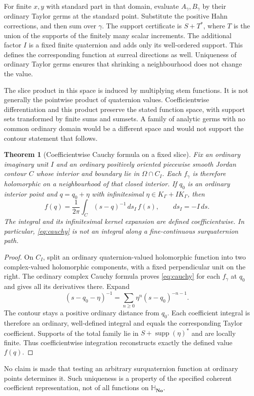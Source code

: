 \documentclass[11pt,letterpaper]{article}
\newtheorem{theorem}{Theorem}[section]
\theoremstyle{definition}
\newcommand{\No}{\mathbf{No}}
\newcommand{\SQ}{\mathbb H_{\No}}
\DeclareMathOperator{\supp}{supp}
\begin{document}
For finite $x,y$ with standard part in that domain, evaluate $A_\gamma,B_\gamma$
by their ordinary Taylor germs at the standard point. Substitute the positive
Hahn corrections, and then sum over $\gamma$. The support certificate is
$S+T^*$, where $T$ is the union of the supports of the finitely many scalar
increments. The additional factor $I$ is a fixed finite quaternion and adds
only its well-ordered support. This defines the corresponding function at
surreal directions as well. Uniqueness of ordinary Taylor germs ensures that
shrinking a neighbourhood does not change the value.

The slice product in this space is induced by multiplying stem functions. It
is not generally the pointwise product of quaternion values. Coefficientwise
differentiation and this product preserve the stated function space, with
support sets transformed by finite sums and sumsets. A family of analytic
germs with no common ordinary domain would be a different space and would not
support the contour statement that follows.

\begin{theorem}[Coefficientwise Cauchy formula on a fixed slice]
\label{thm:cauchy}
Fix an ordinary imaginary unit $I$ and an ordinary positively oriented
piecewise smooth Jordan contour $C$ whose interior and boundary lie in
$\Omega\cap C_I$. Each $f_\gamma$ is therefore holomorphic on a neighbourhood
of that closed interior. If $q_0$ is an ordinary interior point
and $q=q_0+\eta$ with infinitesimal $\eta\in K_\Gamma+IK_\Gamma$, then
\begin{equation}
 f(q)=\frac{1}{2\pi}\int_C (s-q)^{-1}\,ds_I\,f(s),\qquad ds_I=-I\,ds.
 \label{eq:cauchy}
\end{equation}
The integral and its infinitesimal kernel expansion are defined
coefficientwise. In particular, \eqref{eq:cauchy} is not an integral along a
fine-continuous surquaternion path.
\end{theorem}
\begin{proof}
On $C_I$, split an ordinary quaternion-valued holomorphic function into two
complex-valued holomorphic components, with a fixed perpendicular unit on the
right. The ordinary complex Cauchy formula proves \eqref{eq:cauchy} for each
$f_\gamma$ at $q_0$ and gives all its derivatives there. Expand
\[
 (s-q_0-\eta)^{-1}=\sum_{n\ge0}\eta^n(s-q_0)^{-n-1}.
\]
The contour stays a positive ordinary distance from $q_0$. Each coefficient
integral is therefore an ordinary, well-defined integral and equals the
corresponding Taylor coefficient. Supports of the total family lie in
$S+\supp(\eta)^*$ and are locally finite. Thus coefficientwise integration
reconstructs exactly the defined value $f(q)$.
\end{proof}
No claim is made that testing an arbitrary surquaternion function at ordinary
points determines it. Such uniqueness is a property of the specified coherent
coefficient representation, not of all functions on $\SQ$.
\end{document}
